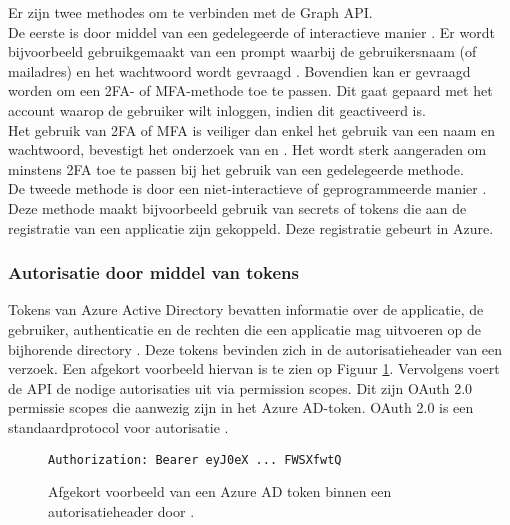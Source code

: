 Er zijn twee methodes om te verbinden met de Graph \ac{API}. \\

De eerste is door middel van een gedelegeerde of interactieve manier \autocite{Microsoft2023u}. Er wordt bijvoorbeeld gebruikgemaakt van een prompt waarbij de gebruikersnaam (of mailadres) en het wachtwoord wordt gevraagd \autocite{Bertocci2015}. Bovendien kan er gevraagd worden om een \ac{2FA}- of \ac{MFA}-methode toe te passen. Dit gaat gepaard met het account waarop de gebruiker wilt inloggen, indien dit geactiveerd is. \\

Het gebruik van \ac{2FA} of \ac{MFA} is veiliger dan enkel het gebruik van een naam en wachtwoord, bevestigt het onderzoek van \textcite{Gunson2011} en \textcite{Banyal2013}. Het wordt sterk aangeraden om minstens \ac{2FA} toe te passen bij het gebruik van een gedelegeerde methode. \\

De tweede methode is door een niet-interactieve of geprogrammeerde manier \autocite{Microsoft2023t}. Deze methode maakt bijvoorbeeld gebruik van secrets of tokens die aan de registratie van een applicatie zijn gekoppeld. Deze registratie gebeurt in Azure. 



\subsubsection{Autorisatie door middel van tokens}


Tokens van Azure Active Directory bevatten informatie over de applicatie, de gebruiker, authenticatie en de rechten die een applicatie mag uitvoeren op de bijhorende directory \autocite{Microsoft2015}. Deze tokens bevinden zich in de autorisatieheader van een verzoek. Een afgekort voorbeeld hiervan is te zien op Figuur \ref{ahtoken}. Vervolgens voert de \ac{API} de nodige autorisaties uit via permission scopes. Dit zijn OAuth 2.0 permissie scopes die aanwezig zijn in het Azure \Ac{AD}-token. OAuth 2.0 is een standaardprotocol voor autorisatie \autocite{OAuth}. \\

\begin{figure}[h!]
    \scriptsize
    \begin{verbatim}
Authorization: Bearer eyJ0eX ... FWSXfwtQ
    \end{verbatim}    
    \caption[Voorbeeld Azure AD token]{Afgekort voorbeeld van een Azure \Ac{AD} token binnen een autorisatieheader door \textcite{Microsoft2015}.}
    \label{ahtoken}
\end{figure}

